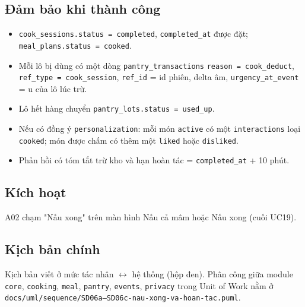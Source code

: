 \subsection{Đảm bảo khi thành công}
\begin{itemize}
\item {\small\texttt{cook\_\allowbreak{}\allowbreak{}sessions.\allowbreak{}status = completed}}, {\small\texttt{completed\_\allowbreak{}\allowbreak{}at}} được đặt; {\small\texttt{meal\_\allowbreak{}\allowbreak{}plans.\allowbreak{}status = cooked}}.
\item Mỗi lô bị dùng có một dòng {\small\texttt{pantry\_\allowbreak{}\allowbreak{}transactions}} {\small\texttt{reason = cook\_\allowbreak{}\allowbreak{}deduct}}, {\small\texttt{ref\_\allowbreak{}\allowbreak{}type = cook\_\allowbreak{}\allowbreak{}session}}, {\small\texttt{ref\_\allowbreak{}\allowbreak{}id}} = id phiên, delta âm, {\small\texttt{urgency\_\allowbreak{}\allowbreak{}at\_\allowbreak{}\allowbreak{}event}} = u của lô lúc trừ.
\item Lô hết hàng chuyển {\small\texttt{pantry\_\allowbreak{}\allowbreak{}lots.\allowbreak{}status = used\_\allowbreak{}\allowbreak{}up}}.
\item Nếu có đồng ý {\small\texttt{personalization}}: mỗi món {\small\texttt{active}} có một {\small\texttt{interactions}} loại {\small\texttt{cooked}}; món được chấm có thêm một {\small\texttt{liked}} hoặc {\small\texttt{disliked}}.
\item Phản hồi có tóm tắt trừ kho và hạn hoàn tác = {\small\texttt{completed\_\allowbreak{}\allowbreak{}at}} + 10 phút.
\end{itemize}
\subsection{Kích hoạt}
A02 chạm "Nấu xong" trên màn hình Nấu cả mâm hoặc Nấu xong (cuối UC19).

\subsection{Kịch bản chính}
Kịch bản viết ở mức tác nhân \ensuremath{\leftrightarrow} hệ thống (hộp đen). Phân công giữa module {\small\texttt{core}}, {\small\texttt{cooking}}, {\small\texttt{meal}}, {\small\texttt{pantry}}, {\small\texttt{events}}, {\small\texttt{privacy}} trong Unit of Work nằm ở {\small\texttt{docs/\allowbreak{}\allowbreak{}uml/\allowbreak{}\allowbreak{}sequence/\allowbreak{}\allowbreak{}SD06a–SD06c-\allowbreak{}nau-\allowbreak{}xong-\allowbreak{}va-\allowbreak{}hoan-\allowbreak{}tac.\allowbreak{}puml}}.

